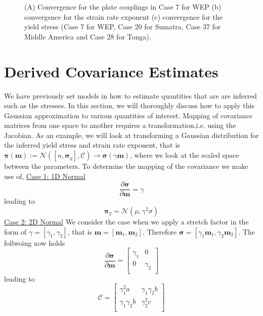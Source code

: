 \documentclass[12pt]{article}
\newcommand{\mm}{{\ensuremath{\boldsymbol{m}}}}
\newcommand{\ppi}{{\ensuremath{\boldsymbol{\pi}}}}
\newcommand{\ssigma}{{\ensuremath{\boldsymbol{\sigma}}}}
\begin{document}
{\begin{figure}[H]
\caption{(A) Convergence for the plate couplings in Case 7 for WEP (b) convergence for the strain rate exponent  (c) convergence for the yield stress (Case 7 for WEP, Case 20 for Sumatra, Case 37 for Middle America and Case 28 for Tonga).}
\label{fig:model_convergence}
\end{figure}


\section{Derived Covariance Estimates}
We have previously set models in how to estimate quantities that are are inferred such as the stresses. In this section, we will thoroughly discuss how to apply this Gaussian approximation to various quantities of interest. Mapping of covariance matrices from one space to another requires  a transformation,i.e. using the Jacobian. As an example, we will look at transforming a Gaussian distribution for the inferred yield stress and strain rate exponent, that is $\ppi(\mm):= \mathcal{N}([n,\ssigma_y],\mathcal C) \rightarrow \ssigma(\gamma \mm)$, where we look at the scaled space between the parameters. To determine the mapping of the covariance we make use of,
\underline{Case 1: 1D Normal}
\begin{equation}
\frac{\partial \ssigma}{\partial \mm} = \gamma
\end{equation}
leading to
\begin{equation}
\ppi_2 = \mathcal N(\mu,\gamma^2\sigma)
\end{equation}
\underline{Case 2: 2D Normal}
We consider the case when we apply a stretch factor in the form of $\gamma = [\gamma_1, \gamma_2]$, that is $\mm = [\mm_1, \mm_2]$. Therefore $\ssigma = [\gamma_1 \mm_1, \gamma_2 \mm_2]$. The follwoing now holds
\begin{equation}
\frac{\partial \ssigma}{\partial \mm} = 
\begin{bmatrix}
\gamma_1 & 0 \\
0 & \gamma_2 \\
\end{bmatrix}
\end{equation}
leading to
\begin{equation}
\mathcal C = 
\begin{bmatrix}
\gamma_1^2 a & \gamma_1 \gamma_2 b \\
\gamma_1 \gamma_2 b & \gamma_2^2 c \\
\end{bmatrix}
\end{equation}

}
\end{document}
